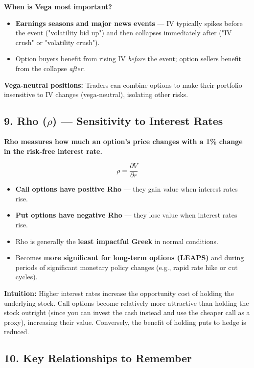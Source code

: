 \documentclass[12pt,openany]{book}
\begin{document}
\textbf{When is Vega most important?}
\begin{itemize}[leftmargin=*]
    \item \textbf{Earnings seasons and major news events} — IV typically spikes before the event ("volatility bid up") and then collapses immediately after ("IV crush" or "volatility crush").
    \item Option buyers benefit from rising IV \emph{before} the event; option sellers benefit from the collapse \emph{after}.
\end{itemize}

\textbf{Vega-neutral positions:} Traders can combine options to make their portfolio insensitive to IV changes (vega-neutral), isolating other risks.

\subsection{9. Rho (\texorpdfstring{\(\rho\)}{rho}) — Sensitivity to Interest Rates}

\textbf{Rho measures how much an option's price changes with a 1\% change in the risk-free interest rate.}

\[
\rho = \frac{\partial V}{\partial r}
\]

\begin{itemize}[leftmargin=*]
    \item \textbf{Call options have positive Rho} — they gain value when interest rates rise.
    \item \textbf{Put options have negative Rho} — they lose value when interest rates rise.
    \item Rho is generally the \textbf{least impactful Greek} in normal conditions.
    \item Becomes \textbf{more significant for long-term options (LEAPS)} and during periods of significant monetary policy changes (e.g., rapid rate hike or cut cycles).
\end{itemize}

\textbf{Intuition:} Higher interest rates increase the opportunity cost of holding the underlying stock. Call options become relatively more attractive than holding the stock outright (since you can invest the cash instead and use the cheaper call as a proxy), increasing their value. Conversely, the benefit of holding puts to hedge is reduced.

\subsection{10. Key Relationships to Remember}
\end{document}

